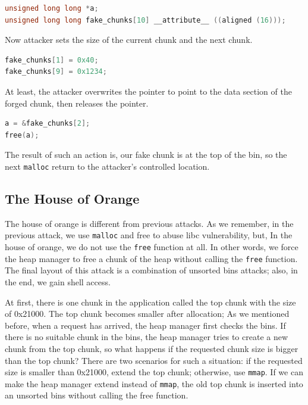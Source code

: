 \documentclass{masterthesis}
\newcommand*\ub{unsorted bins}
\newcommand*\mallocc{\lstinline{malloc}\xspace}
\newcommand*\freec{\lstinline{free}\xspace}
\newcommand*\mmapc{\lstinline{mmap}\xspace}
\begin{document}
\begin{lstlisting}[language=c,frame=tlrb]
unsigned long long *a;
unsigned long long fake_chunks[10] __attribute__ ((aligned (16)));
\end{lstlisting}

Now attacker sets the size of the current chunk and the next chunk.

\begin{lstlisting}[language=c,frame=tlrb]
fake_chunks[1] = 0x40;
fake_chunks[9] = 0x1234;
\end{lstlisting}

At least, the attacker overwrites the pointer to point to the data section of the forged chunk, then releases the pointer.

\begin{lstlisting}[language=c,frame=tlrb]
a = &fake_chunks[2];
free(a);
\end{lstlisting}

The result of such an action is, our fake chunk is at the top of the bin, so the next \mallocc{} return to the attacker's controlled location.

\subsection{The House of Orange}
\label{subsect:houseorange}
The house of orange is different from previous attacks. As we remember, in the previous attack, we use \mallocc{} and free to abuse libc vulnerability, but, In the house of orange, we do not use the \freec{} function at all. In other words, we force the heap manager to free a chunk of the heap without calling the \freec{} function. The final layout of this attack is a combination of \ub{} attacks; also, in the end, we gain shell access.

At first, there is one chunk in the application called the top chunk with the size of 0x21000. The top chunk becomes smaller after allocation; As we mentioned before, when a request has arrived, the heap manager first checks the bins. If there is no suitable chunk in the bins, the heap manager tries to create a new chunk from the top chunk, so what happens if the requested chunk size is bigger than the top chunk? There are two scenarios for such a situation: if the requested size is smaller than 0x21000, extend the top chunk; otherwise, use \mmapc{}. If we can make the heap manager extend instead of \mmapc{}, the old top chunk is inserted into an \ub{} without calling the free function.
\end{document}
